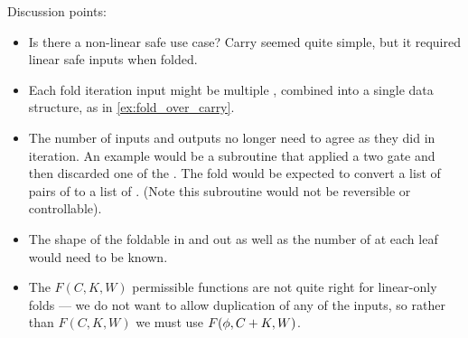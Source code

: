 Discussion points:
\begin{itemize}
  \item Is there a non-linear safe use case? Carry seemed quite simple,
    but it required linear safe inputs when folded.
  \item Each fold iteration input might be multiple ,
    combined into a single data structure, as in 
    \vref{ex:fold_over_carry}.
  \item The number of inputs and outputs no longer need
    to agree as they did in iteration.  An example would be a subroutine that
    applied a two \qubit gate and then discarded one of the \qubits.
    The fold would be expected to convert a list of pairs  of 
    to a list of . (Note this subroutine would not be reversible
    or controllable).
  \item The shape of the foldable in and out as well as the number of \qubits
    at each leaf would need to be known.
  \item The $F(C,K,W)$ permissible functions are not quite right for
    linear-only folds --- we do not want to allow duplication of any of
    the inputs, so rather than $F(C,K,W)$ we must use $F(\phi,C+K,W)$.
\end{itemize}

